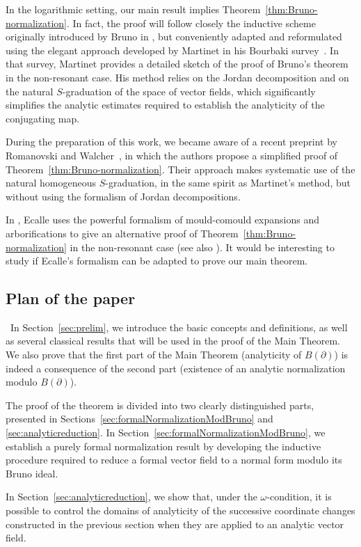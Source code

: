 \documentclass[10pt,twoside,reqno]{amsart}
\theoremstyle{remark}
\theoremstyle{remark}
\begin{document}
In the logarithmic setting, our main result implies Theorem~\ref{thm:Bruno-normalization}.
In fact, the proof will follow closely the inductive scheme originally introduced by Bruno in \cite{Bruno1971_1972}, 
but conveniently adapted and reformulated using the elegant approach developed by Martinet in his Bourbaki 
survey~\cite{Martinet1981Norm}. In that survey, Martinet provides a detailed sketch 
of the proof of Bruno’s theorem in the non-resonant case. His method relies on the 
Jordan decomposition and on the natural \(S\)-graduation of the space of vector 
fields, which significantly simplifies the analytic estimates required to 
establish the analyticity of the conjugating map.

During the preparation of this work, we became aware of a recent preprint by 
Romanovski and Walcher~\cite{RomanovskiWalcher2025}, in which the authors propose 
a simplified proof of Theorem~\ref{thm:Bruno-normalization}. Their approach makes 
systematic use of the natural homogeneous \(S\)-graduation, in the same spirit 
as Martinet’s method, but without using the formalism of Jordan decompositions.

In \cite{Ecalle1992}, Ecalle uses the powerful formalism of mould-comould expansions and arborifications to give an alternative proof of Theorem~\ref{thm:Bruno-normalization} in the non-resonant case (see also \cite{FauvetMenousSauzin2025}). It would be interesting to study if Ecalle's formalism can be adapted to prove our main theorem. 
\subsection{Plan of the paper} In Section~\ref{sec:prelim}, we introduce the basic concepts and definitions, as
well as several classical results that will be used in the proof of
the Main Theorem. We also prove that the first part of the Main Theorem (analyticity of $B(\partial)$) is indeed a consequence of the second part (existence of an analytic normalization modulo $B(\partial)$).

The proof of the theorem is divided into two clearly distinguished parts,
presented in Sections~\ref{sec:formalNormalizationModBruno} and 
\ref{sec:analyticreduction}. In
Section~\ref{sec:formalNormalizationModBruno}, we establish a purely formal
normalization result by developing the inductive procedure required to reduce
a formal vector field to a normal form modulo its Bruno ideal.

In Section~\ref{sec:analyticreduction}, we show that, under the
\(\omega\)-condition, it is possible to control the domains of analyticity of
the successive coordinate changes constructed in the previous section when
they are applied to an analytic vector field.
\end{document}
